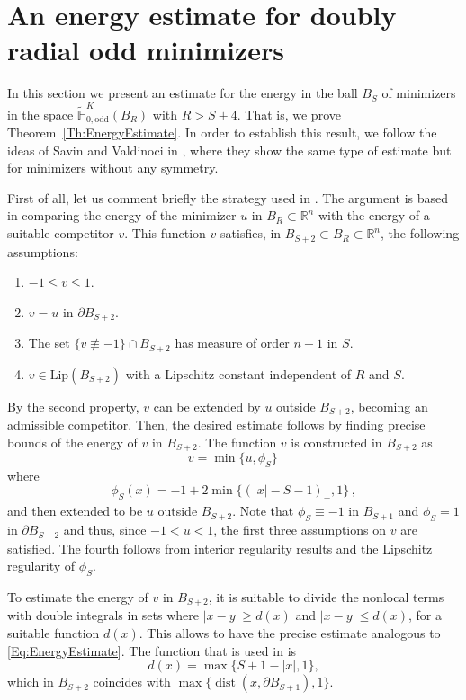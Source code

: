 \documentclass[12pt,reqno]{amsart}
\theoremstyle{definition}
\theoremstyle{remark}
\newcommand{\con}[1]{\mathbb{#1}}
\newcommand{\R}{\con{R}} %
\renewcommand{\H}{\con{H}}
\newcommand{\Lip}{\mathrm{Lip}}
\DeclareMathOperator{\dist}{dist}
\numberwithin{equation}{section}
\begin{document}
\section{An energy estimate for doubly radial odd minimizers}
\label{Sec:EnergyEstimate}

In this section we present an estimate for the energy in the ball $B_S$ of minimizers in the space $\widetilde{\H}^K_{0, \mathrm{odd}}(B_R)$ with $R > S+ 4$. That is, we prove Theorem~\ref{Th:EnergyEstimate}. In order to establish this result, we follow the ideas of Savin and Valdinoci in \cite{SavinValdinoci-EnergyEstimate}, where they show the same type of estimate but for minimizers without any symmetry.


First of all, let us comment briefly the strategy used in \cite{SavinValdinoci-EnergyEstimate}. The argument is based in comparing the energy of the minimizer $u$ in $B_R\subset \R^n$ with the energy of a suitable competitor $v$. This function $v$ satisfies, in $B_{S+2}\subset B_R \subset \R^n$, the following assumptions:
\begin{enumerate}[label=(\textit{\roman*})]
	\item $-1 \leq v \leq 1$.
	\item $v=u$ in $\partial B_{S+2}$.
	\item The set $\{v\not \equiv -1\}\cap B_{S+2}$ has measure of order $n-1$ in $S$.
	\item $v\in \Lip(\overline{B_{S+2}})$ with a Lipschitz constant independent of $R$ and $S$.
\end{enumerate} 
By the second property, $v$ can be extended by $u$ outside $B_{S+2}$, becoming an admissible competitor. Then, the desired estimate follows by finding precise bounds of the energy of $v$ in $B_{S+2}$. The function $v$ is constructed in $B_{S+2}$ as
$$
v = \min \{u, \phi_S\}\,
$$
where
\begin{equation}
\label{Eq:DefPhiS}
\phi_S (x) =-1+2\min\{(|x|-S-1)_+,1\}\,,
\end{equation}
and then extended to be $u$ outside $B_{S+2}$. Note that $\phi_S \equiv -1$ in $B_{S+1}$ and $\phi_S = 1$ in $\partial B_{S+2}$ and thus, since $-1<u<1$, the first three assumptions on $v$ are satisfied. The fourth follows from interior regularity results and the Lipschitz regularity of $\phi_S$.

To estimate the energy of $v$ in $B_{S+2}$, it is suitable to divide the nonlocal terms with double integrals in sets where $|x-y|\geq d(x)$ and $|x-y|\leq d(x)$, for a suitable function $d(x)$. This allows to have the precise estimate analogous to \eqref{Eq:EnergyEstimate}. The function that is used in \cite{SavinValdinoci-EnergyEstimate} is 
\begin{equation}
\label{Eq:DefdSavinValdinoci}
d (x) = \max \{S+1-|x| , 1\},
\end{equation}
which in $B_{S+2}$ coincides with $\max\{ \dist (x, \partial B_{S+1}), 1\}$.
\end{document}
